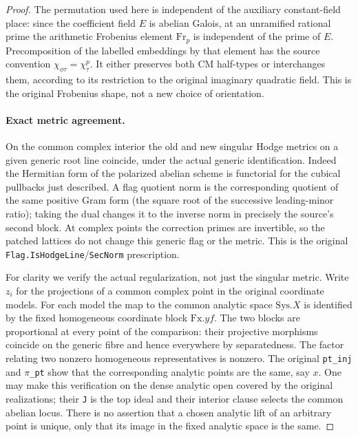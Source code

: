 \begin{proof}
The permutation used here is independent of the auxiliary
constant-field place: since the coefficient field \(E\)
is abelian Galois, at an unramified rational prime the
arithmetic Frobenius element \(\mathrm{Fr}_p\) is independent
of the prime of \(E\). Precomposition of the labelled
embeddings by that element has the source convention
\(\chi_{\phi\tau}=\chi_\tau^p\). It either preserves
both CM half-types or interchanges them, according to its
restriction to the original imaginary quadratic field.
This is the original Frobenius shape, not a new choice
of orientation.

\paragraph{Exact metric agreement.}
On the common complex interior the old and new singular
Hodge metrics on a given generic root line coincide,
under the actual generic identification. Indeed the
Hermitian form of the polarized abelian scheme is
functorial for the cubical pullbacks just described.
A flag quotient norm is the corresponding quotient of
the same positive Gram form (the square root of the
successive leading-minor ratio); taking the dual changes
it to the inverse norm in precisely the source's second
block. At complex points the correction primes are
invertible, so the patched lattices do not change this
generic flag or the metric. This is the original
\texttt{Flag.IsHodgeLine}/\texttt{SecNorm} prescription.

For clarity we verify the actual regularization, not just
the singular metric. Write \(z_i\) for the projections of
a common complex point in the original coordinate models.
For each model the map to the common analytic space
\(\mathrm{Sys}.X\) is identified by the fixed homogeneous
coordinate block \(\mathrm{Fx}.yf\).
The two blocks are proportional at every point of the
comparison: their projective morphisms coincide on the
generic fibre and hence everywhere by separatedness.
The factor relating two nonzero homogeneous
representatives is nonzero. The original \texttt{pt\_inj}
and \texttt{\(\pi\)\_pt} show that the corresponding
analytic points are the same, say \(x\).
One may make this verification on the dense analytic
open covered by the original realizations; their
\texttt{J} is the top ideal and their interior clause
selects the common abelian locus. There is no assertion
that a chosen analytic lift of an arbitrary point is
unique, only that its image in the fixed analytic space
is the same.


\end{proof}
